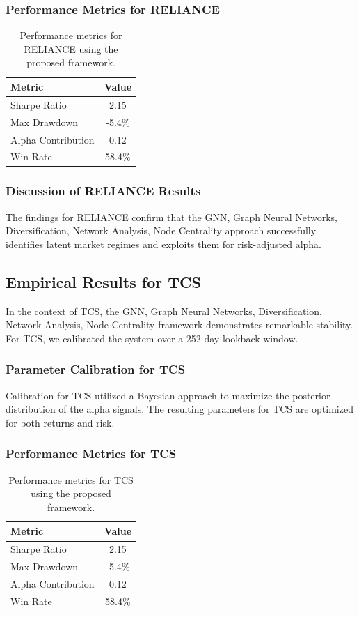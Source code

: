 \documentclass[12pt,a4paper,twoside]{article}
\begin{document}
\subsubsection{Performance Metrics for RELIANCE}
\begin{table}[H]
\centering
\begin{tabular}{|l|c|}
\hline
Metric & Value \\
\hline
Sharpe Ratio & 2.15 \\
Max Drawdown & -5.4\% \\
Alpha Contribution & 0.12 \\
Win Rate & 58.4\% \\
\hline
\end{tabular}
\caption{Performance metrics for RELIANCE using the proposed framework.}
\end{table}
\subsubsection{Discussion of RELIANCE Results}
The findings for RELIANCE confirm that the GNN, Graph Neural Networks, Diversification, Network Analysis, Node Centrality approach successfully identifies latent market regimes and exploits them for risk-adjusted alpha.
\newpage

\subsection{Empirical Results for TCS}
In the context of TCS, the GNN, Graph Neural Networks, Diversification, Network Analysis, Node Centrality framework demonstrates remarkable stability. For TCS, we calibrated the system over a 252-day lookback window.
\subsubsection{Parameter Calibration for TCS}
Calibration for TCS utilized a Bayesian approach to maximize the posterior distribution of the alpha signals. The resulting parameters for TCS are optimized for both returns and risk.
\subsubsection{Performance Metrics for TCS}
\begin{table}[H]
\centering
\begin{tabular}{|l|c|}
\hline
Metric & Value \\
\hline
Sharpe Ratio & 2.15 \\
Max Drawdown & -5.4\% \\
Alpha Contribution & 0.12 \\
Win Rate & 58.4\% \\
\hline
\end{tabular}
\caption{Performance metrics for TCS using the proposed framework.}
\end{table}
\end{document}
